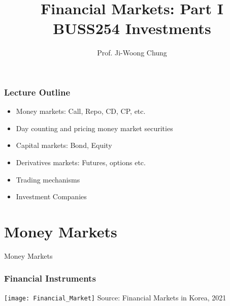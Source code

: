 \documentclass[10pt]{beamer}
\title{Financial Markets: Part I \\
	\vspace{5pt} {\footnotesize BUSS254 Investments}}
\author{Prof. Ji-Woong Chung}
\institute{}
\date{}
\begin{document}
	
	\frame{\titlepage}
	\graphicspath{{figures//}}
	
	
	\begin{frame}
		\frametitle{Lecture Outline}
		\begin{itemize}\itemsep15pt
			\item Money markets: Call, Repo, CD, CP, etc.
			\item Day counting and pricing money market securities
			\item Capital markets: Bond, Equity
			\item Derivatives markets: Futures, options etc.
			\item Trading mechanisms
			\item Investment Companies
		\end{itemize}
	\end{frame}
	
	
	
	\section{Money Markets}
	\begin{frame}
		\begin{center}
			{\Large Money Markets}
		\end{center}
	\end{frame}
	
	
	
	\begin{frame}
		\frametitle{Financial Instruments} \vspace{-10pt}
		\begin{center}
			\texttt{[image: Financial\_Market]}
			{\scriptsize Source: Financial Markets in Korea, 2021}		
		\end{center}
		
	\end{frame}
	
\end{document}
